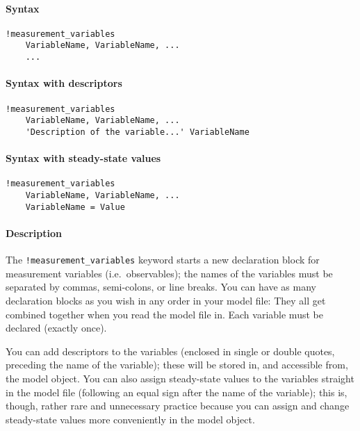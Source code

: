 


	\paragraph{Syntax}

\begin{verbatim}
!measurement_variables
    VariableName, VariableName, ...
    ...
\end{verbatim}

\paragraph{Syntax with descriptors}

\begin{verbatim}
!measurement_variables
    VariableName, VariableName, ...
    'Description of the variable...' VariableName
\end{verbatim}

\paragraph{Syntax with steady-state
values}

\begin{verbatim}
!measurement_variables
    VariableName, VariableName, ...
    VariableName = Value
\end{verbatim}

\paragraph{Description}

The \texttt{!measurement\_variables} keyword starts a new declaration
block for measurement variables (i.e.~observables); the names of the
variables must be separated by commas, semi-colons, or line breaks. You
can have as many declaration blocks as you wish in any order in your
model file: They all get combined together when you read the model file
in. Each variable must be declared (exactly once).

You can add descriptors to the variables (enclosed in single or double
quotes, preceding the name of the variable); these will be stored in,
and accessible from, the model object. You can also assign steady-state
values to the variables straight in the model file (following an equal
sign after the name of the variable); this is, though, rather rare and
unnecessary practice because you can assign and change steady-state
values more conveniently in the model object.

